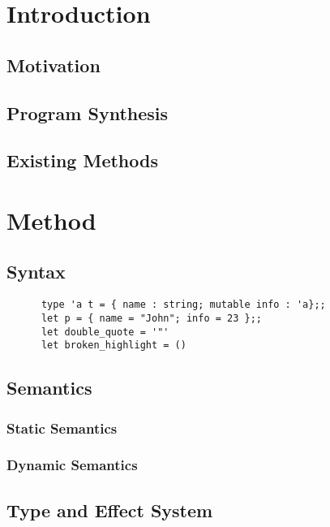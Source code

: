 \documentclass[12pt, a4paper, titlepage]{report}
\begin{document}
\chapter{Introduction} \label{section:introduction}
  \section{Motivation}
  \section{Program Synthesis}
    \cite{gulwani2017program}
  \section{Existing Methods}

\chapter{Method}\label{section:method}
  \section{Syntax}
    \begin{verbatim}
      type 'a t = { name : string; mutable info : 'a};;
      let p = { name = "John"; info = 23 };;
      let double_quote = '"'
      let broken_highlight = ()
    \end{verbatim}
  \section{Semantics}
    \subsection{Static Semantics} %
    \subsection{Dynamic Semantics} %
  \section{Type and Effect System}
\end{document}
